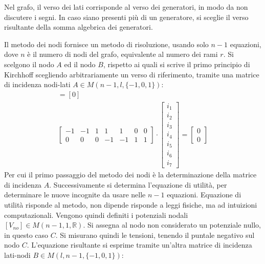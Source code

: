 \documentclass{article}
\numberwithin{equation}{subsection}
\begin{document}
Nel grafo, il verso dei lati corrisponde al verso dei generatori, in modo da non discutere i segni. In caso siano presenti più di un generatore, si sceglie il verso risultante 
della somma algebrica dei generatori. %



Il metodo dei nodi fornisce un metodo di risoluzione, usando solo $n-1$ equazioni, dove $n$ è il numero di nodi del grafo, equivalente al numero dei rami $r$. 
Si scelgono il nodo $A$ ed il nodo $B$, rispetto ai quali si scrive il primo principio di Kirchhoff scegliendo arbitrariamente un verso di riferimento, tramite una matrice di 
incidenza nodi-lati $A\in M(n-1,l,\{-1,0,1\})$:
\begin{gather*}
    [A][i_l]=[0]\\
    \begin{bmatrix}
        -1&-1&1&1&1&0&0\\
        0&0&0&-1&-1&1&1
    \end{bmatrix}\cdot\begin{bmatrix}
        i_1\\
        i_2\\
        i_3\\
        i_4\\
        i_5\\
        i_6\\
        i_7
    \end{bmatrix}=\begin{bmatrix}
        0\\
        0
    \end{bmatrix}
\end{gather*}
Per cui il primo passaggio del metodo dei nodi è la determinazione della matrice di incidenza $A$. Successivamente si determina l'equazione di utilità, per determinare le nuove 
incognite da usare nelle $n-1$ equazioni. Equazione di utilità risponde al metodo, non dipende risponde a leggi fisiche, ma ad intuizioni computazionali. 
Vengono quindi definiti i potenziali nodali $[V_{no}]\in M(n-1,1,\mathbb{R})$. Si assegna al nodo non considerato un potenziale nullo, in questo caso $C$. 
Si misurano quindi le tensioni, tenendo il puntale negativo sul nodo $C$. L'equazione risultante si esprime tramite un'altra matrice di incidenza lati-nodi $B\in M(l,n-1,\{-1,0,1\})$: 
\end{document}
